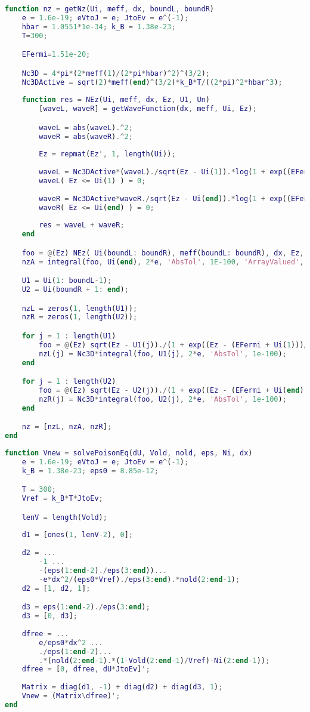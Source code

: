 \begin{lstlisting}[style=realcode,language=Matlab,caption={Алгоритм оценки дипломных работ}]
function nz = getNz(Ui, meff, dx, boundL, boundR)
	e = 1.6e-19; eVtoJ = e; JtoEv = e^(-1); 
	hbar = 1.0551*1e-34; k_B = 1.38e-23;
	T=300;

	EFermi=1.51e-20;

	Nc3D = 4*pi*(2*meff(1)/(2*pi*hbar)^2)^(3/2);
	Nc3DActive = sqrt(2)*meff(end)^(3/2)*k_B*T/((2*pi)^2*hbar^3);
	
	function res = NEz(Ui, meff, dx, Ez, U1, Un)
		[waveL, waveR] = getWaveFunction(dx, meff, Ui, Ez);

		waveL = abs(waveL).^2;
		waveR = abs(waveR).^2;
		
		Ez = repmat(Ez', 1, length(Ui));
		
		waveL = Nc3DActive*(waveL)./sqrt(Ez - Ui(1)).*log(1 + exp((EFermi + U1 - Ez)/(k_B*T)));
		waveL( Ez <= Ui(1) ) = 0;
		
		waveR = Nc3DActive*waveR./sqrt(Ez - Ui(end)).*log(1 + exp((EFermi + Un - Ez)/(k_B*T)));
		waveR( Ez <= Ui(end) ) = 0;
		
		res = waveL + waveR;
	end

	foo = @(Ez) NEz( Ui(boundL: boundR), meff(boundL: boundR), dx, Ez, Ui(1), Ui(end) );
	nzA = integral(foo, Ui(end), 2*e, 'AbsTol', 1E-100, 'ArrayValued', true);

	U1 = Ui(1: boundL-1);
	U2 = Ui(boundR + 1: end);

	nzL = zeros(1, length(U1));
	nzR = zeros(1, length(U2));

	for j = 1 : length(U1)
		foo = @(Ez) sqrt(Ez - U1(j))./(1 + exp((Ez - (EFermi + Ui(1)))/(k_B*T)));
		nzL(j) = Nc3D*integral(foo, U1(j), 2*e, 'AbsTol', 1e-100);
	end

	for j = 1 : length(U2)
		foo = @(Ez) sqrt(Ez - U2(j))./(1 + exp((Ez - (EFermi + Ui(end)))/(k_B*T)));
		nzR(j) = Nc3D*integral(foo, U2(j), 2*e, 'AbsTol', 1e-100);
	end

	nz = [nzL, nzA, nzR];
end

\end{lstlisting}
\begin{lstlisting}[style=realcode,language=Matlab,caption={Алгоритм оценки дипломных работ}]
function Vnew = solvePoisonEq(dU, Vold, nold, eps, Ni, dx)
	e = 1.6e-19; eVtoJ = e; JtoEv = e^(-1); 	
	k_B = 1.38e-23; eps0 = 8.85e-12;

	T = 300;
	Vref = k_B*T*JtoEv;

	lenV = length(Vold);
	
	d1 = [ones(1, lenV-2), 0];
	
	d2 = ...
		-1 ...
		-(eps(1:end-2)./eps(3:end))...
		-e*dx^2/(eps0*Vref)./eps(3:end).*nold(2:end-1);
	d2 = [1, d2, 1];

	d3 = eps(1:end-2)./eps(3:end);
	d3 = [0, d3];
	
	dfree = ...
		e/eps0*dx^2 ...
		./eps(1:end-2)...
		.*(nold(2:end-1).*(1-Vold(2:end-1)/Vref)-Ni(2:end-1));
	dfree = [0, dfree, dU*JtoEv]';
	
	Matrix = diag(d1, -1) + diag(d2) + diag(d3, 1);
	Vnew = (Matrix\dfree)';
end
\end{lstlisting}
